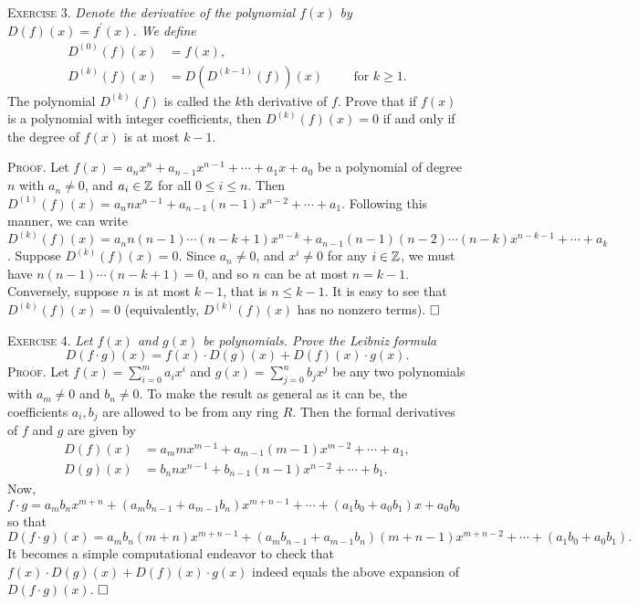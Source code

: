 \documentclass[11pt, leqno]{article}
\newcommand{\done}{\ensuremath{\hfill\square}}
\begin{document}
\textsc{Exercise 3}. \emph{Denote the derivative of the polynomial $f(x)$ by $D(f)(x) = f^{\prime}(x)$. We define 
\begin{align*}
  D^{(0)}(f)(x) &= f(x), \\
  D^{(k)}(f)(x) &= D\left( D^{(k-1)}(f) \right) (x) \hspace{1cm} \text{for } k\geq 1.
\end{align*}}The polynomial $D^{(k)}(f)$ is called the $k$th derivative of $f$. Prove that if $f(x)$ is a polynomial with integer coefficients, then $D^{(k)}(f)(x) = 0$ if and only if the degree of $f(x)$ is at most $k-1$.

\textsc{Proof}. Let $f(x) = a_nx^n + a_{n-1}x^{n-1} + \cdots + a_1x + a_0$ be a polynomial of degree $n$ with $a_n \ne 0$, and $a_i \in \mathbb{Z}$ for all $0\leq i \leq n$. Then $D^{(1)}(f)(x) = a_nnx^{n-1} + a_{n-1}(n-1)x^{n-2} + \cdots + a_1$. Following this manner, we can write $D^{(k)}(f)(x) = a_nn(n-1)\cdots (n-k+1)x^{n-k} + a_{n-1}(n-1)(n-2)\cdots (n-k)x^{n-k-1} + \cdots + a_k$. Suppose $D^{(k)}(f)(x) = 0$. Since $a_n\ne 0$, and $x^i\ne 0$ for any $i\in \mathbb{Z}$, we must have $n(n-1)\cdots (n-k+1) = 0$, and so $n$ can be at most $n = k-1$. Conversely, suppose $n$ is at most $k-1$, that is $n \leq k-1$. It is easy to see that $D^{(k)}(f)(x) = 0$ (equivalently, $D^{(k)}(f)(x)$ has no nonzero terms). \done

\textsc{Exercise 4}. \emph{Let $f(x)$ and $g(x)$ be polynomials. Prove the Leibniz formula 
\begin{displaymath}
D(f\cdot g)(x) = f(x)\cdot D(g)(x) + D(f)(x)\cdot g(x).
\end{displaymath}}\textsc{Proof}. Let $f(x) = \sum_{i=0}^m a_ix^i$ and $g(x) = \sum_{j=0}^{n}b_jx^j$ be any two polynomials with $a_m \ne 0$ and $b_n \ne 0$. To make the result as general as it can be, the coefficients $a_i, b_j$ are allowed to be from any ring $R$. Then the formal derivatives of $f$ and $g$ are given by 
\begin{align*}
  D(f)(x) &= a_mmx^{m-1} + a_{m-1}(m-1)x^{m-2} + \cdots + a_1, \\
  D(g)(x) &= b_nnx^{n-1} + b_{n-1}(n-1)x^{n-2} + \cdots + b_1.
\end{align*}
Now, $f\cdot g = a_mb_nx^{m+n} + (a_mb_{n-1}+a_{m-1}b_n)x^{m+n-1} + \cdots + (a_1b_0+a_0b_1)x + a_0b_0$ so that 
\begin{displaymath}
  D(f\cdot g)(x) = a_mb_n(m+n)x^{m+n-1} + (a_mb_{n-1}+a_{m-1}b_n)(m+n-1)x^{m+n-2} + \cdots + (a_1b_0 + a_0b_1).
\end{displaymath}
It becomes a simple computational endeavor to check that $f(x)\cdot D(g)(x) + D(f)(x)\cdot g(x)$ indeed equals the above expansion of $D(f\cdot g)(x)$. \done
\end{document}
